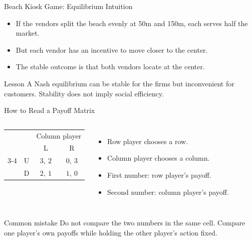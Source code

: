 \documentclass[10pt,aspectratio=169]{beamer}
\newcommand{\pay}[2]{#1,\ #2}
\begin{document}
\begin{frame}{Beach Kiosk Game: Equilibrium Intuition}
\begin{itemize}
  \item If the vendors split the beach evenly at 50m and 150m, each serves half the market.
  \item But each vendor has an incentive to move closer to the center.
  \item The stable outcome is that both vendors locate at the center.
\end{itemize}
\vspace{0.3cm}
\begin{block}{Lesson}
A Nash equilibrium can be stable for the firms but inconvenient for customers. Stability does not imply social efficiency.
\end{block}
\end{frame}

\begin{frame}{How to Read a Payoff Matrix}
\begin{columns}[T]
\begin{center}
\begin{tabular}{c c c c}
 & & \multicolumn{2}{c}{Column player}\\
 & & L & R\\
\cmidrule{3-4}
\multirow{2}{*}{Row player} & U & $\pay{3}{2}$ & $\pay{0}{3}$\\
 & D & $\pay{2}{1}$ & $\pay{1}{0}$\\
\end{tabular}
\end{center}
\begin{itemize}
  \item Row player chooses a row.
  \item Column player chooses a column.
  \item First number: row player's payoff.
  \item Second number: column player's payoff.
\end{itemize}
\end{columns}
\vspace{0.25cm}
\begin{alertblock}{Common mistake}
Do not compare the two numbers in the same cell. Compare one player's own payoffs while holding the other player's action fixed.
\end{alertblock}
\end{frame}
\end{document}
